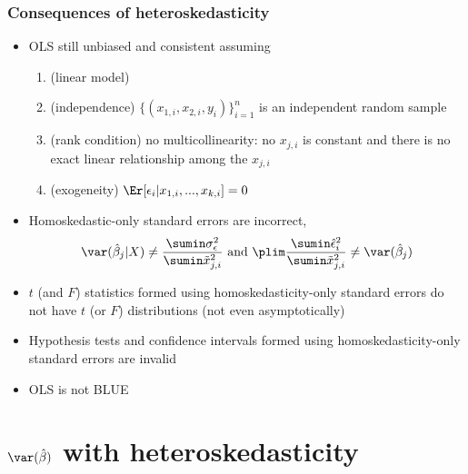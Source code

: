 \begin{frame} \frametitle{Consequences of heteroskedasticity}
  \begin{itemize}
  \item OLS still unbiased and consistent assuming 
    \begin{enumerate}
    \item[MLR.1] (linear model) 
    \item[MLR.2] (independence) $\{(x_{1,i},x_{2,i},y_i)\}_{i=1}^n$ is
      an independent random sample
    \item[MLR.3] (rank condition) no multicollinearity: no $x_{j,i}$ is
      constant and there is no exact linear relationship among the $x_{j,i}$
    \item[MLR.4] (exogeneity) $\Er[\epsilon_i | x_{1,i},..., x_{k,i}] = 0$      
    \end{enumerate}
  \item Homoskedastic-only standard errors are incorrect, 
    \[ \var(\hat{\beta}_j|X) \neq \frac{\sumin \sigma_\epsilon^2 } {\sumin
      \tilde{x}_{j,i}^2} \text{ and } \plim \frac{\sumin \hat{\epsilon}_i^2 }{\sumin
      \tilde{x}_{j,i}^2} \neq \var(\hat{\beta}_j) \]
  \item $t$ (and $F$) statistics formed using homoskedasticity-only
    standard errors do not have $t$ (or $F$) distributions (not even
    asymptotically)
  \item Hypothesis tests and confidence intervals formed  using
    homoskedasticity-only standard errors are invalid
  \item OLS is not BLUE
  \end{itemize}
\end{frame}

\section{$\var(\hat{\beta})$ with heteroskedasticity}

